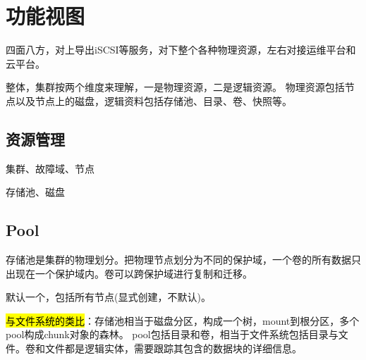 \chapter{功能视图}


四面八方，对上导出iSCSI等服务，对下整个各种物理资源，左右对接运维平台和云平台。

整体，集群按两个维度来理解，一是物理资源，二是逻辑资源。
物理资源包括节点以及节点上的磁盘，逻辑资料包括存储池、目录、卷、快照等。

\section{资源管理}

集群、故障域、节点

存储池、磁盘

\section{Pool}

存储池是集群的物理划分。把物理节点划分为不同的保护域，一个卷的所有数据只出现在一个保护域内。卷可以跨保护域进行复制和迁移。

默认一个，包括所有节点(显式创建，不默认)。

\hl{与文件系统的类比}：存储池相当于磁盘分区，构成一个树，mount到根分区，多个pool构成chunk对象的森林。
pool包括目录和卷，相当于文件系统包括目录与文件。卷和文件都是逻辑实体，需要跟踪其包含的数据块的详细信息。

